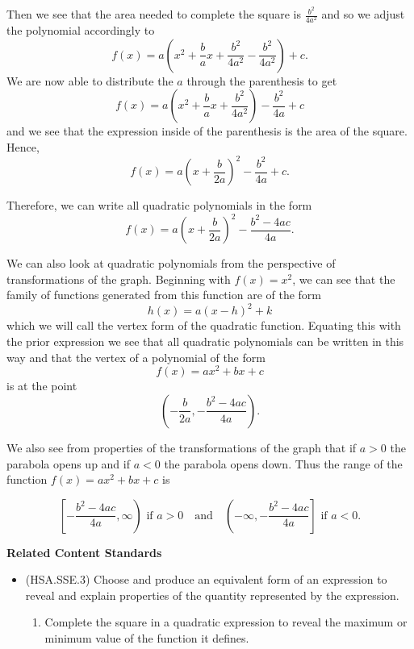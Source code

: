 \documentclass[
]{book}
\providecommand{\tightlist}{%
  \setlength{\itemsep}{0pt}\setlength{\parskip}{0pt}}
\newenvironment{standards}{}{}
\theoremstyle{definition}
\theoremstyle{definition}
\theoremstyle{definition}
\theoremstyle{definition}
\theoremstyle{remark}
\begin{document}
Then we see that the area needed to complete the square is
\(\frac{b^2}{4a^2}\) and so we adjust the polynomial accordingly to
\[f(x) = a \left( x^2 +\frac{b}{a}x + \frac{b^2}{4a^2} - \frac{b^2}{4a^2} \right) + c.\] We are now able to distribute the \(a\) through the parenthesis to get
\[f(x) = a \left( x^2 +\frac{b}{a}x + \frac{b^2}{4a^2}  \right)- \frac{b^2}{4a} + c\] and we see that the expression inside of the parenthesis is the area of the square. Hence,
\[f(x) = a \left(x+\frac{b}{2a}  \right)^2- \frac{b^2}{4a} + c.\]

Therefore, we can write all quadratic polynomials in the form
\[f(x) = a \left(x+\frac{b}{2a}  \right)^2- \frac{b^2-4ac}{4a}.\]

We can also look at quadratic polynomials from the perspective of transformations of the graph. Beginning with \(f(x)=x^2\), we can see that the family of functions generated from this function are of the form \[h(x)= a (x-h)^2 + k\] which we will call the vertex form of the quadratic function. Equating this with the prior expression we see that all quadratic polynomials can be written in this way and that the vertex of a polynomial of the form \[f(x)=ax^2+bx+c\] is at the point \[\left(-\frac{b}{2a}, - \frac{b^2-4ac}{4a}\right).\]

We also see from properties of the transformations of the graph that if \(a>0\) the parabola opens up and if \(a<0\) the parabola opens down. Thus the range of the function \(f(x)=ax^2+bx+c\) is

\[\left[-\frac{b^2-4ac}{4a}, \infty \right) \mbox{ if } a>0 \quad \mbox{and} \quad \left(-\infty, -\frac{b^2-4ac}{4a}\right] \mbox{ if } a<0.\]

\begin{standards}

\begin{center}
\textbf{Related Content Standards}

\end{center}

\begin{itemize}
\tightlist
\item
  (HSA.SSE.3) Choose and produce an equivalent form of an expression to reveal and explain properties of the quantity represented by the expression.

  \begin{enumerate}
  \def\labelenumi{\alph{enumi}.}
  \setcounter{enumi}{1}
  \tightlist
  \item
    Complete the square in a quadratic expression to reveal the maximum or minimum value of the function it defines.
  \end{enumerate}
\end{itemize}

\end{standards}
\end{document}
